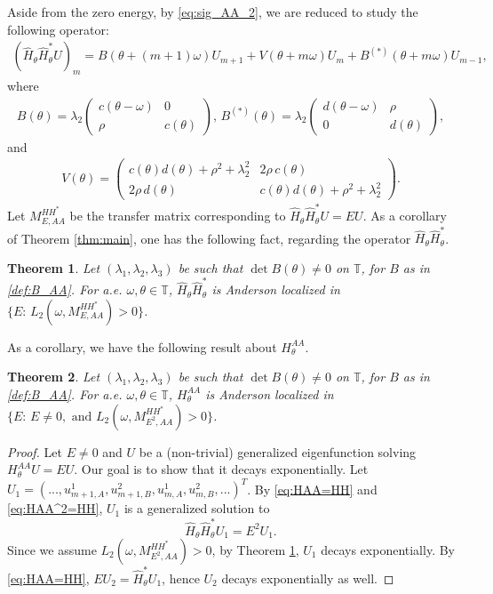 \documentclass[11pt]{amsart}
\newtheorem{theorem}{Theorem}[section]
\newcommand{\T}{\mathbb T}
\begin{document}
Aside from the zero energy, by \eqref{eq:sig_AA_2}, we are reduced to study the following operator:
\begin{align}
    (\widehat{H}_{\theta} \widehat{H}_{\theta}^*U)_m=B(\theta+(m+1)\omega)U_{m+1}+V(\theta+m\omega)U_m+B^{(*)}(\theta+m\omega)U_{m-1},
\end{align}
where 
\begin{align}\label{def:B_AA}
B(\theta)=\lambda_2 \left(\begin{matrix}c(\theta-\omega) &0\\ \rho &c(\theta)\end{matrix}\right),\, B^{(*)}(\theta)=\lambda_2 \left(\begin{matrix} d(\theta-\omega) &\rho\\ 0 &d(\theta)\end{matrix}\right),
\end{align}
and
\begin{align}
    V(\theta)=\left(\begin{matrix} c(\theta)d(\theta)+\rho^2+\lambda_2^2 & 2\rho\, c(\theta)\\ 2\rho\, d(\theta) &c(\theta)d(\theta)+\rho^2+\lambda_2^2
    \end{matrix}\right).
\end{align}
Let $M_{E,AA}^{HH^*}$ be the transfer matrix corresponding to $\widehat{H}_{\theta}\widehat{H}_{\theta}^*U=EU$.
As a corollary of Theorem \ref{thm:main}, one has the following fact, regarding the operator $\widehat{H}_{\theta}\widehat{H}_{\theta}^*$.
\begin{theorem}\label{thm:HH_loc}
Let $(\lambda_1,\lambda_2,\lambda_3)$ be such that $\det B(\theta)\neq 0$ on $\T$, for $B$ as in \eqref{def:B_AA}.
    For a.e. $\omega,\theta\in \T$, $\widehat{H}_{\theta}\widehat{H}_{\theta}^*$ is Anderson localized in $\{E:\, L_2(\omega, M_{E,AA}^{HH^*})>0\}$.
\end{theorem}
As a corollary, we have the following result about $H_{\theta}^{AA}$.
\begin{theorem}\label{thm:AA_loc}
Let $(\lambda_1,\lambda_2,\lambda_3)$ be such that $\det B(\theta)\neq 0$ on $\T$, for $B$ as in \eqref{def:B_AA}.
    For a.e. $\omega,\theta\in \T$, $H_{\theta}^{AA}$ is Anderson localized in $\{E:\, E\neq 0, \text{ and }  L_2(\omega,M_{E^2,AA}^{HH^*})>0\}$.
\end{theorem}
\begin{proof}
    Let $E\neq 0$ and $U$ be a (non-trivial) generalized eigenfunction solving $H_{\theta}^{AA}U=EU$. Our goal is to show that it decays exponentially. Let $U_1=(...,u_{m+1,A}^1, u_{m+1,B}^2, u_{m,A}^1, u_{m,B}^2,...)^T$. By \eqref{eq:HAA=HH} and \eqref{eq:HAA^2=HH}, $U_1$ is a generalized solution to \[\widehat{H}_{\theta}\widehat{H}_{\theta}^*U_1=E^2U_1.\]
    Since we assume $L_2(\omega,M_{E^2,AA}^{HH^*})>0$, by Theorem \ref{thm:HH_loc}, $U_1$ decays exponentially.
    By \eqref{eq:HAA=HH}, $EU_2=\widehat{H}^*_{\theta}U_1$, hence $U_2$ decays exponentially as well. 
\end{proof}
\end{document}
